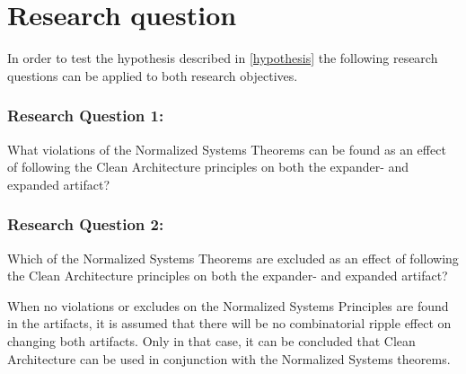 \section{Research question} \label{sec:research_questions}
In order to test the hypothesis described in \ref{hypothesis} the following research
questions can be applied to both research objectives.

\subsubsection*{Research Question 1:}
What violations of the Normalized Systems Theorems can be found as an effect of
following the Clean Architecture principles on both the expander- and expanded artifact?

\subsubsection*{Research Question 2:}
Which of the Normalized Systems Theorems are excluded as an effect of following the
Clean Architecture principles on both the expander- and expanded artifact?

When no violations or excludes on the Normalized Systems Principles are found in the
artifacts, it is assumed that there will be no combinatorial ripple effect on changing
both artifacts. Only in that case, it can be concluded that Clean Architecture can be
used in conjunction with the Normalized Systems theorems. 